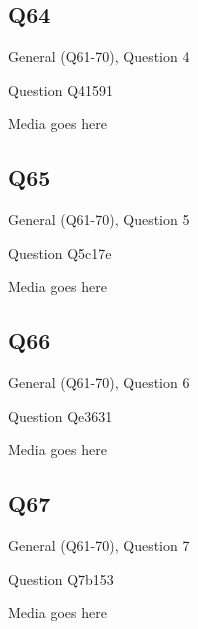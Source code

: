 \documentclass[11pt]{beamer}
\begin{document}
\subsection*{Q64}
\begin{frame}[t]{General (Q61-70), Question 4}
\vspace{2em}
\begin{block}{Question}
Q41591
\end{block}
\begin{center}
Media goes here
\end{center}
\end{frame}
    

\subsection*{Q65}
\begin{frame}[t]{General (Q61-70), Question 5}
\vspace{2em}
\begin{block}{Question}
Q5c17e
\end{block}
\begin{center}
Media goes here
\end{center}
\end{frame}
    

\subsection*{Q66}
\begin{frame}[t]{General (Q61-70), Question 6}
\vspace{2em}
\begin{block}{Question}
Qe3631
\end{block}
\begin{center}
Media goes here
\end{center}
\end{frame}
    

\subsection*{Q67}
\begin{frame}[t]{General (Q61-70), Question 7}
\vspace{2em}
\begin{block}{Question}
Q7b153
\end{block}
\begin{center}
Media goes here
\end{center}
\end{frame}
    
\end{document}
